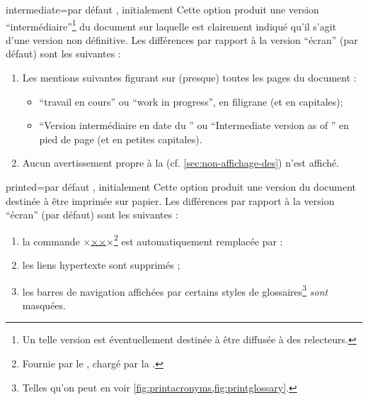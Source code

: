 \begin{docKey}{intermediate}{=\textbar{}}{par défaut ,
    initialement }
  Cette option produit une version \enquote{intermédiaire}\footnote{Un telle
    version est éventuellement destinée à être diffusée à des relecteurs.} du
  document sur laquelle est clairement indiqué qu'il s'agit d'une version non
  définitive. Les différences par rapport à la version \enquote{écran} (par
  défaut) sont les suivantes :
  \begin{enumerate}
  \item Les mentions suivantes figurant sur (presque) toutes les pages du
    document :
    \begin{itemize}
    \item \enquote{travail en cours} ou \foreignquote{english}{work in
        progress}\selonlangue{}, en filigrane (et en capitales);
    \item \enquote{Version intermédiaire en date du } ou
      \foreignquote{english}{Intermediate version as of
        }\selonlangue{} en pied de page (et en petites
        capitales).
    \end{itemize}
  \item Aucun avertissement propre à la \yatcl{}
    (cf. \vref{sec:non-affichage-des}) n'est affiché.
  \end{enumerate}
\end{docKey}

\begin{docKey}{printed}{=\textbar{}}{par défaut ,
    initialement }
  Cette option produit une version du document destinée à être imprimée
  sur papier. Les différences par rapport à la version \enquote{écran} (par
  défaut) sont les suivantes :
  \begin{enumerate}
  \item la commande
    ×\href{×\meta{\acrshort*{url}}×}{××}×\footnote{Fournie par le
      , chargé par la \yatcl{}.} est automatiquement
    remplacée par :
  \item les liens hypertexte sont supprimés ;
  \item les barres de navigation affichées par certains styles de
    glossaires\footnote{Telles qu'on peut en voir
      \vref{fig:printacronyms,fig:printglossary}.} \emph{sont} masquées.
  \end{enumerate}
\end{docKey}

